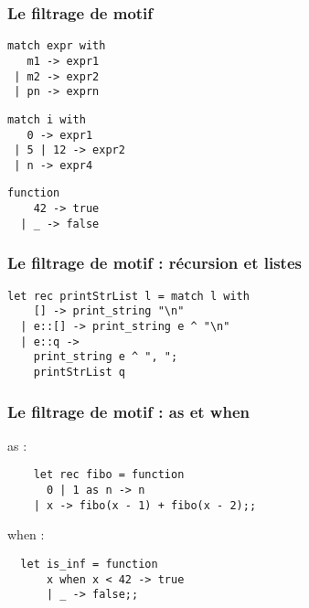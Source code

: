 \begin{frame}[fragile]
	\frametitle{Le filtrage de motif}
	\begin{center}
	\begin{minipage}{4cm}
		\begin{lstlisting}
match expr with
   m1 -> expr1
 | m2 -> expr2
 | pn -> exprn
		\end{lstlisting}
	\end{minipage}
	\begin{minipage}{5cm}
		\begin{lstlisting}
match i with
   0 -> expr1
 | 5 | 12 -> expr2
 | n -> expr4
		\end{lstlisting}
	\end{minipage}
	
	\begin{minipage}{3cm}
		\begin{lstlisting}
function
    42 -> true
  | _ -> false
		\end{lstlisting} 
	\end{minipage}
	\end{center}
\end{frame}

\begin{frame}[fragile]
	\frametitle{Le filtrage de motif : récursion et listes}
		\begin{lstlisting}
let rec printStrList l = match l with
    [] -> print_string "\n"
  | e::[] -> print_string e ^ "\n"
  | e::q -> 
    print_string e ^ ", ";
    printStrList q
		\end{lstlisting}
\end{frame}

\begin{frame}[fragile]
  \frametitle{Le filtrage de motif : as et when}
  \begin{itemize}
  \begin{minipage}[t]{5cm}
  \item
    as :
    \begin{lstlisting}
	let rec fibo = function 
 	  0 | 1 as n -> n 
 	| x -> fibo(x - 1) + fibo(x - 2);; 
    \end{lstlisting}
  \end{minipage}
  \begin{minipage}[t]{5cm}
  \item
    when :
    \begin{lstlisting}
  let is_inf = function 
      x when x < 42 -> true
 	  | _ -> false;;
    \end{lstlisting}
  \end{minipage}
  \end{itemize}
\end{frame}

